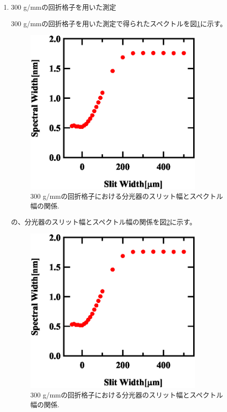 \documentclass[11pt,a4j]{jsarticle}
\begin{document}
\begin{enumerate}%
 \item 300 g/mmの回折格子を用いた測定

       300 g/mmの回折格子を用いた測定で得られたスペクトルを図\ref{fig_300all}に示す。

       \begin{figure}[ht]
        \centering
        \includegraphics[clip,width=9cm]{start1_300Spectrum1.eps}
        \caption{300 g/mmの回折格子における分光器のスリット幅とスペクトル幅の関係.}
        \label{fig_300all}
       \end{figure}

       の、分光器のスリット幅とスペクトル幅の関係を図\ref{fig_300spectrum1}に示す。

       \begin{figure}[ht]
        \centering
        \includegraphics[clip,width=9cm]{start1_300Spectrum1.eps}
        \caption{300 g/mmの回折格子における分光器のスリット幅とスペクトル幅の関係.}
        \label{fig_300spectrum1}
       \end{figure}



\end{enumerate}
\end{document}
